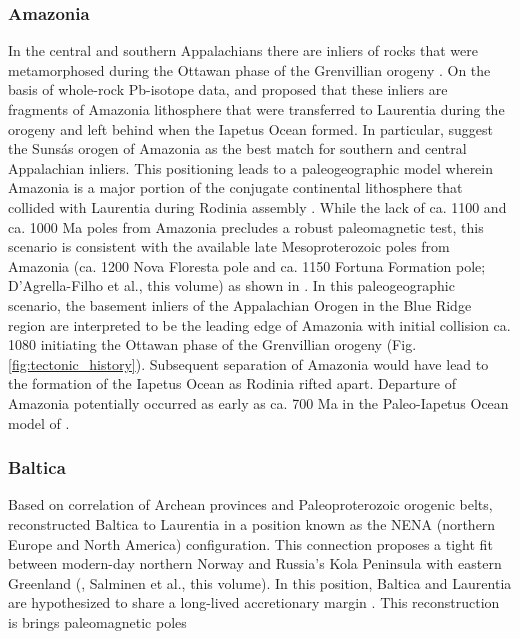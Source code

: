 \documentclass[11pt,letterpaper]{article}
\begin{document}
\subsubsection{Amazonia}

In the central and southern Appalachians there are inliers of rocks that were metamorphosed during the Ottawan phase of the Grenvillian orogeny \citep{McLelland2013a}. On the basis of whole-rock Pb-isotope data, \cite{Loewy2003a} and \cite{Fisher2010a} proposed that these inliers are fragments of Amazonia lithosphere that were transferred to Laurentia during the orogeny and left behind when the Iapetus Ocean formed. In particular, \cite{Fisher2010a} suggest the Suns\'as orogen of Amazonia as the best match for southern and central Appalachian inliers. This positioning leads to a paleogeographic model wherein Amazonia is a major portion of the conjugate continental lithosphere that collided with Laurentia during Rodinia assembly \citep{Evans2013a, Cawood2017a}. While the lack of ca. 1100 and ca. 1000 Ma poles from Amazonia precludes a robust paleomagnetic test, this scenario is consistent with the available late Mesoproterozoic poles from Amazonia (ca. 1200 Nova Floresta pole and ca. 1150 Fortuna Formation pole; D'Agrella-Filho et al., this volume) as shown in \cite{Evans2013a}. In this paleogeographic scenario, the basement inliers of the Appalachian Orogen in the Blue Ridge region are interpreted to be the leading edge of Amazonia with initial collision ca. 1080 initiating the Ottawan phase of the Grenvillian orogeny (Fig. \ref{fig:tectonic_history}). Subsequent separation of Amazonia would have lead to the formation of the Iapetus Ocean as Rodinia rifted apart. Departure of Amazonia potentially occurred as early as ca. 700 Ma in the Paleo-Iapetus Ocean model of  \citet{Robert2020a}.

\subsubsection{Baltica}
Based on correlation of Archean provinces and Paleoproterozoic orogenic belts, \cite{Gower1990a} reconstructed Baltica to Laurentia in a position known as the NENA (northern Europe and North America) configuration. This connection proposes a tight fit between modern-day northern Norway and Russia's Kola Peninsula with eastern Greenland (\citealp{Gower1990a}, Salminen et al., this volume). In this position, Baltica and Laurentia are hypothesized to share a long-lived accretionary margin \citep{Karlstrom2001a}. This reconstruction is brings paleomagnetic poles
\end{document}
